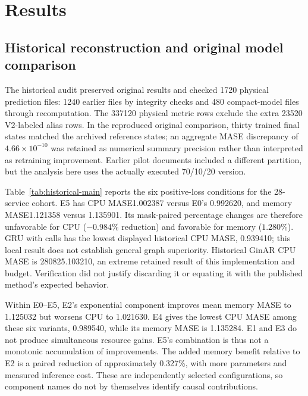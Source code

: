 \section{Results}
\subsection{Historical reconstruction and original model comparison}\label{sec:historical-loss}
The historical audit preserved original results and checked 1720 physical prediction files: 1240 earlier files by integrity checks and 480 compact-model files through recomputation. The 337120 physical metric rows exclude the extra 23520 V2-labeled alias rows. In the reproduced original comparison, thirty trained final states matched the archived reference states; an aggregate MASE discrepancy of $4.66\times10^{-10}$ was retained as numerical summary precision rather than interpreted as retraining improvement. Earlier pilot documents included a different partition, but the analysis here uses the actually executed 70/10/20 version.

Table~\ref{tab:historical-main} reports the six positive-loss conditions for the 28-service cohort. E5 has CPU MASE1.002387 versus E0's 0.992620, and memory MASE1.121358 versus 1.135901. Its mask-paired percentage changes are therefore unfavorable for CPU ($-0.984\%$ reduction) and favorable for memory ($1.280\%$). GRU with calls has the lowest displayed historical CPU MASE, 0.939410; this local result does not establish general graph superiority. Historical GinAR CPU MASE is 280825.103210, an extreme retained result of this implementation and budget. Verification did not justify discarding it or equating it with the published method's expected behavior.

\begin{table}[!t]
\caption{Historical six-positive-loss means, source28, three neural seeds and twenty masks. Absolute CPU errors retain publisher scale and memory errors are bytes. V2 is a selected alias, not an additional fit. These values must not be mixed with destination32 errors.}\label{tab:historical-main}
\centering\footnotesize
\FitTable{}
\end{table}

Within E0--E5, E2's exponential component improves mean memory MASE to 1.125032 but worsens CPU to 1.021630. E4 gives the lowest CPU MASE among these six variants, 0.989540, while its memory MASE is 1.135284. E1 and E3 do not produce simultaneous resource gains. E5's combination is thus not a monotonic accumulation of improvements. The added memory benefit relative to E2 is a paired reduction of approximately 0.327\%, with more parameters and measured inference cost. These are independently selected configurations, so component names do not by themselves identify causal contributions.

